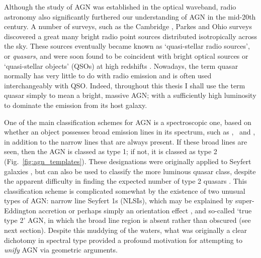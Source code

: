 Although the study of AGN was established in the optical waveband, 
radio astronomy also significantly furthered our understanding of AGN
in the mid-20th century. A number of surveys, such as the Cambridge \citep{edge1959}, 
Parkes \citep{ekers1969} and Ohio \citep{ehman1970} surveys discovered a great many 
bright radio point sources distributed isotropically across the sky.
These sources eventually became known as `quasi-stellar radio sources',
or {\em quasars}, and were soon found to be coincident with bright optical
sources or `quasi-stellar objects' (QSOs) at high 
redshifts \citep{schmidt1963,schmidt1965a,schmidt1965b}.
Nowadays, the term quasar normally has very little to do with 
radio emission and is often used interchangeably with QSO. 
Indeed, throughout this thesis I shall use the term quasar simply to mean a bright, 
massive AGN; with a sufficiently high luminosity to dominate the emission 
from its host galaxy.

One of the main classification schemes for AGN is a spectroscopic one, based on 
whether an object possesses broad emission lines in its spectrum, 
such as \civ, \hb\ and
\la, in addition to the narrow lines that are always present. 
If these broad lines are seen, then the AGN is classed as type 1;
if not, it is classed as type 2 (Fig.~\ref{fig:agn_templates}).
These designations were originally applied to Seyfert galaxies \citep{seyfert1943}, 
but can also be used to classify the more luminous quasar class, despite the apparent
difficulty in finding the expected number of type 2 quasars \citep{zakamska2003}. 
This classification scheme is complicated somewhat by the existence of two
unusual types of AGN: narrow line Seyfert 1s (NLSIs), which
may be explained by super-Eddington accretion \citep{done2015} 
or perhaps simply an orientation effect \citep{baldi2016},
and so-called `true type 2' AGN, in which the broad line region is absent 
\citep{tran2001,shi2010} rather than obscured (see next section).
Despite this muddying of the waters, what was originally a 
clear dichotomy in spectral type provided a 
profound motivation for attempting to {\em unify} AGN via geometric arguments.




